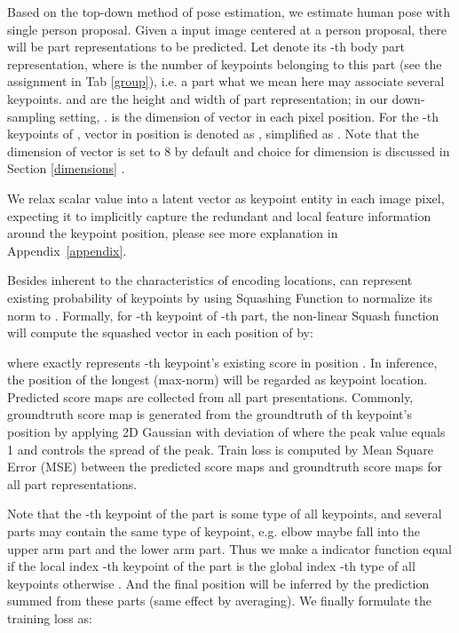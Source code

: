 \documentclass[journal]{IEEEtran}
\begin{document}
Based on the top-down method of pose estimation, we estimate human pose with single person proposal. Given a input image  centered at a person proposal, there will be  part representations  to be predicted. Let  denote its -th body part representation, where  is the number of keypoints belonging to this part (see the assignment in Tab \ref{group}), i.e. a part what we mean here may associate several keypoints.   and  are the height and width of part representation; in our down-sampling setting, .   is the dimension of vector in each pixel position. For the -th keypoints of , vector in position  is denoted as , simplified as . Note that the dimension   of vector is set to 8 by default and choice for dimension is discussed in Section \ref{dimensions} .

We relax scalar value into a latent vector as keypoint entity in each image pixel, expecting it to implicitly capture the redundant and local feature information around the keypoint position, please see more explanation in Appendix~\ref{appendix}. 

Besides inherent to the characteristics of encoding locations,  can represent existing probability of keypoints by using Squashing Function  \cite{sabour2017dynamic} to normalize its  norm to . Formally, for -th keypoint of -th part, the non-linear Squash function will compute the squashed vector  in each position  of   by:


where  exactly represents -th keypoint's existing score in position . In inference, the position  of the longest (max-norm)  will be regarded as keypoint location. Predicted score maps are collected from all part presentations. Commonly,  groundtruth score map  is generated from the groundtruth of th keypoint's position by applying 2D Gaussian with deviation of  where the peak value equals 1 and   controls the spread of the peak. Train loss  is computed by Mean Square Error (MSE) between the predicted score maps and groundtruth score maps for all  part representations. 

Note that the -th keypoint of the part  is some type of all keypoints, and several parts may contain the same type of keypoint, e.g. elbow maybe fall into the upper arm part and the lower arm part. Thus we make a indicator function  equal  if the local index -th keypoint of the part  is the global index -th type of all keypoints otherwise . And the final position  will be inferred by the prediction summed from these parts (same effect by averaging). We finally formulate the training loss as:
\end{document}
